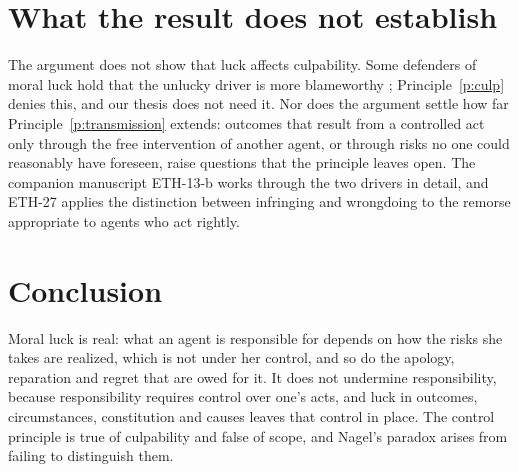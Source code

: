 \documentclass{situationist-preprint}
\begin{document}
\section{What the result does not establish}

The argument does not show that luck affects culpability. Some defenders of moral luck hold that the unlucky driver is more blameworthy \citep{Hartman2017}; Principle~\ref{p:culp} denies this, and our thesis does not need it. Nor does the argument settle how far Principle~\ref{p:transmission} extends: outcomes that result from a controlled act only through the free intervention of another agent, or through risks no one could reasonably have foreseen, raise questions that the principle leaves open. The companion manuscript ETH-13-b works through the two drivers in detail, and ETH-27 applies the distinction between infringing and wrongdoing to the remorse appropriate to agents who act rightly.

\section{Conclusion}

Moral luck is real: what an agent is responsible for depends on how the risks she takes are realized, which is not under her control, and so do the apology, reparation and regret that are owed for it. It does not undermine responsibility, because responsibility requires control over one's acts, and luck in outcomes, circumstances, constitution and causes leaves that control in place. The control principle is true of culpability and false of scope, and Nagel's paradox arises from failing to distinguish them.
\end{document}
